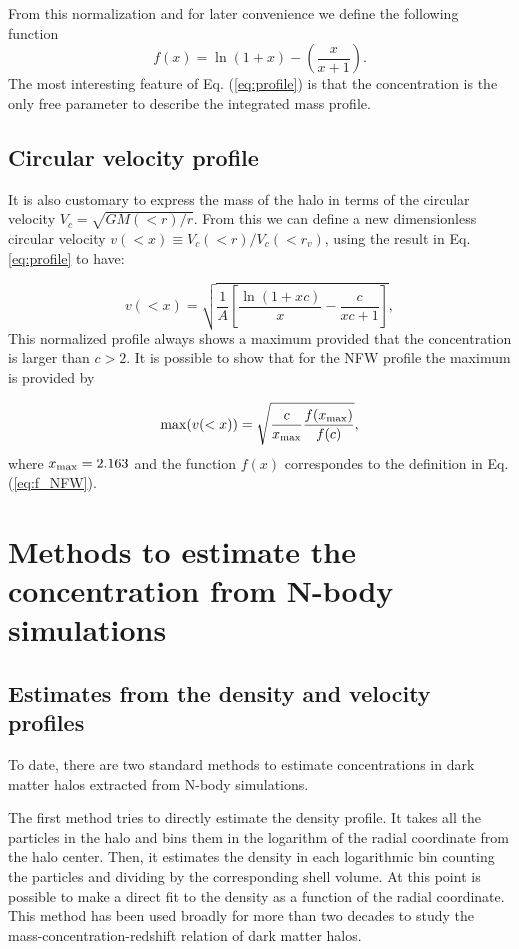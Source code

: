 \documentclass[a4,useAMS,usenatbib,usegraphicx]{mn2e}
\begin{document}
From this normalization and for later convenience we define the
following function
%
\begin{equation}
f(x) = \ln\left(1+x\right)-\left(\frac{x}{x+1}\right).
\label{eq:f_NFW}
\end{equation}
%
The most interesting feature of Eq. (\ref{eq:profile}) is that the
concentration is the only free parameter to describe the integrated
mass profile.
 
\subsection{Circular velocity profile}

It is also customary to express the mass of the halo in terms of the
circular velocity $V_{c}=\sqrt{GM(<r)/r}$.
From this we can define a new dimensionless circular velocity $v(<x)\equiv
V_{c}(<r)/V_{c}(<r_v)$, using the result in Eq. \ref{eq:profile}
to have:

\begin{equation}
v(<x)=\sqrt{\frac{1}{A}\left[\frac{\ln\left(1+xc\right)}{x}-\frac{c}{xc+1}\right]},
\end{equation}
%
This normalized profile always shows a maximum provided that the
concentration is larger than $c>2$.
It is possible to show that for the NFW profile the maximum is
provided by

\begin{equation}
\mathrm{max}(v(<x)) = \sqrt{\frac{c}{x_{\rm max}}\frac{f(x_{\rm
      max})}{f(c)}},
\label{eq:max_v}
\end{equation}
where $x_{\rm max}=2.163$ \citep{Klypin2014} and the function $f(x)$
correspondes to the definition in Eq. (\ref{eq:f_NFW}).

\section{Methods to estimate the concentration from N-body simulations}
\label{sec:method}

\subsection{Estimates from the density and velocity profiles}

To date, there are two standard methods to estimate concentrations in
dark matter halos extracted from N-body simulations. 

The first method tries to directly estimate the density profile.  
It takes all the particles in the halo and bins them in the logarithm of
the radial coordinate from the halo center.  
Then, it estimates the density in each logarithmic bin counting the
particles and dividing by the corresponding shell volume.  
At this point is possible to make a direct fit to the density as a function of the radial coordinate.
This method has been used broadly for more than two decades to study
the mass-concentration-redshift relation of dark matter halos.
 
\end{document}
